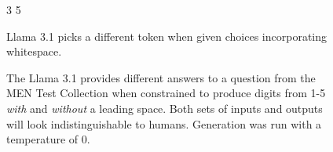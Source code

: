 \begin{figure}[t]
\begin{tcolorbox}[
  width=\linewidth,
  height=2.6in,
  colframe=gray,
  colback=white,
  boxrule=0.5pt,
  arc=2pt,
]
{\begin{center}
    \vspace{0.5em}
    
    3 \hspace{14em} 5
\end{center}

\vspace{0.3em}
\begin{tcolorbox}[
    colback=lightgray,
    coltext=black,
    colframe=lightgray,
    boxrule=0.5pt,
    left=1pt,
    arc=2pt,
    right=1pt,
    top=3pt,
    bottom=3pt,
]
{
\begin{center}
Llama 3.1 picks a different token when given choices incorporating whitespace.
\end{center}
}
\end{tcolorbox}
}

\end{tcolorbox}
\caption{The Llama 3.1 provides different answers to a question from the MEN Test Collection when constrained to produce digits from 1-5 \textit{with} and \textit{without} a leading space. Both sets of inputs and outputs will look indistinguishable to humans. Generation was run with a temperature of 0.}
\label{fig:llama}
\end{figure}
